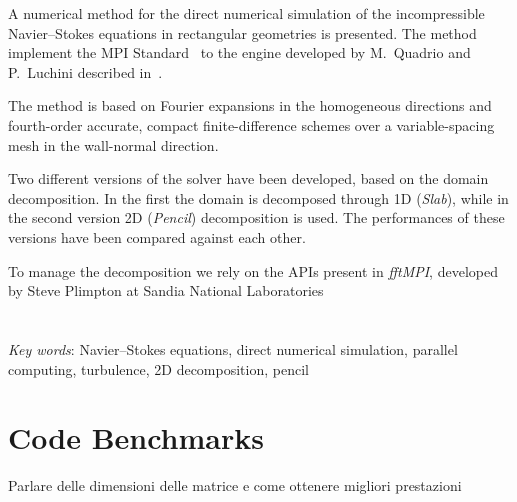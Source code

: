 \documentclass[a4paper,twosides,openright,titlepage]{book}
\newenvironment{abstract}%
	{\cleardoublepage%
		\thispagestyle{empty}%
		\null \vfill\begin{center}%
		\bfseries \abstractname \end{center}}%
	{\vfill\null}
\begin{document}
\begin{abstract}
\hrulefill

A numerical method for the direct numerical simulation of the incompressible Navier–Stokes equations in rectangular geometries is presented. The method implement the MPI Standard~\cite{MPI} to the engine developed by M.~Quadrio and P.~Luchini described in~\cite{cpl:presentazione}. 

The method is based on Fourier expansions in the homogeneous directions and fourth-order accurate, compact finite-difference schemes over a variable-spacing mesh in the wall-normal direction. 

Two different versions of the solver have been developed, based on the domain decomposition.  In the first the domain is decomposed through 1D (\emph{Slab}), while in the second version 2D (\emph{Pencil}) decomposition is used.
The performances of these versions have been compared against each other.

To manage the decomposition we rely on the APIs present in \emph{fftMPI}, developed by Steve Plimpton at Sandia National Laboratories~\cite{fftMPI}
\\
\\
\\
\emph{Key words}: Navier–Stokes equations, direct numerical simulation, parallel computing, turbulence, 2D decomposition, pencil 

\hrulefill
\end{abstract}




\tableofcontents 
\listoffigures 
\listoftables



\mainmatter


\chapter{Code Benchmarks}




\- Parlare delle dimensioni delle matrice e come ottenere migliori prestazioni \cite{tesi:brach}

\backmatter
{} 
\printbibliography
\end{document}
